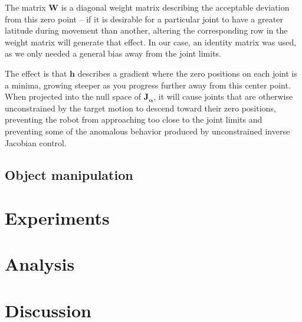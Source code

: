 \documentclass[10pt, conference]{IEEEtran}
\begin{document}
\begin{itemize}
     The matrix \( \mathbf{W} \) is a diagonal weight matrix describing
     the acceptable deviation from this zero point -- if it is desirable
     for a particular joint to have a greater latitude during movement
     than another, altering the corresponding row in the weight matrix
     will generate that effect. In our case, an identity matrix was
     used, as we only needed a general bias away from the joint limits.

     The effect is that \(\mathbf{h}\) describes a gradient where the
     zero positions on each joint is a minima, growing steeper as you
     progress further away from this center point. When projected into
     the null space of \(\mathbf{J_\alpha}\), it will cause joints that
     are otherwise unconstrained by the target motion to descend toward
     their zero positions, preventing the robot from approaching too
     close to the joint limits and preventing some of the anomalous
     behavior produced by unconstrained inverse Jacobian control.

\end{itemize} %
\subsection{Object manipulation}
\label{sec-3-4}
\section{Experiments}
\label{sec-4}
\section{Analysis}
\label{sec-5}
\section{Discussion}
\label{sec-6}
\end{document}
